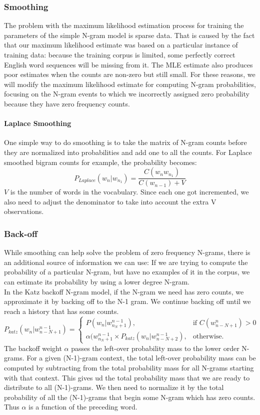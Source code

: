 \documentclass[a4paper,12pt]{article}
\begin{document}
\subsubsection{Smoothing}
The problem with the maximum likelihood estimation process for training the parameters of the simple N-gram model is sparse data. That is caused by the fact that our maximum likelihood estimate was based on a particular instance of training data: because the training corpus is limited, some perfectly correct English word sequences will be missing from it. The MLE estimate also produces poor estimates when the counts are non-zero but still small.
For these reasons, we will modify the maximum likelihood estimate for computing N-gram probabilities, focusing on the N-gram events to which we incorrectly assigned zero probability because they have zero frequency counts.
\paragraph{Laplace Smoothing}
One simple way to do smoothing is to take the matrix of N-gram counts before they are normalized into probabilities and add one to all the counts. 
For Laplace smoothed bigram counts for example, the probability becomes: 
\begin{equation}
P_{Laplace}(w_n|w_{n_1}) = \frac{C(w_n w_{n_1})}{C(w_{n-1}) + V}
\end{equation}
$V$ is the number of words in the vocabulary. Since each one got incremented, we also need to adjust the denominator to take into account the extra V observations.
\subsubsection{Back-off}
While smoothing can help solve the problem of zero frequency N-grams, there is an additional source of information we can use: 
If we are trying to compute the probability of a particular N-gram, but have no examples of it in the corpus, we can estimate its probability by using a lower degree N-gram.\\
In the Katz backoff N-gram model, if the N-gram we need has zero counts, we approximate it by backing off to the N-1 gram. We continue backing off until we reach a history that has some counts.
\[
P_{katz}(w_n|w_{n-N+1}^{n-1}) =
\begin{cases}
    P(w_n|w_{n_N+1}^{n-1}), & \text{if } C(w_{n-N+1}^{n})> 0\\
    \alpha(w_{n_N+1}^{n-1}\times P_{katz}(w_n|w_{n-N+2}^{n-1}),  & \text{otherwise.}
\end{cases}
\]
The backoff weight $\alpha$ passes the left-over probability mass to the lower order N-grams.
For a given (N-1)-gram context, the total left-over probability mass can be computed by subtracting from the total probability mass for all N-grams starting with that context. This gives ud the total probability mass that we are ready to distribute to all (N-1)-grams. We then need to normalize it by the total probability of all the (N-1)-grams that begin some N-gram which has zero counts. Thus $\alpha$ is a function of the preceding word.\\
\end{document}
